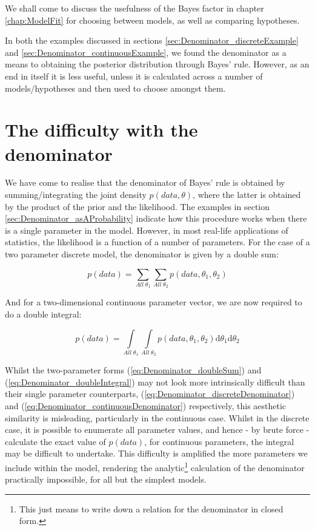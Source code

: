 \documentclass[11pt,fullpage]{book}
\begin{document}
We shall come to discuss the usefulness of the Bayes factor in chapter \ref{chap:ModelFit} for choosing between models, as well as comparing hypotheses.

In both the examples discussed in sections \ref{sec:Denominator_discreteExample} and \ref{sec:Denominator_continuousExample}, we found the denominator as a means to obtaining the posterior distribution through Bayes' rule. However, as an end in itself it is less useful, unless it is calculated across a number of models/hypotheses and then used to choose amongst them.

\section{The difficulty with the denominator}\label{sec:Denominator_difficulty}
We have come to realise that the denominator of Bayes' rule is obtained by summing/integrating the joint density $p(data,\theta)$, where the latter is obtained by the product of the prior and the likelihood. The examples in section \ref{sec:Denominator_asAProbability} indicate how this procedure works when there is a single parameter in the model. However, in most real-life applications of statistics, the likelihood is a function of a number of parameters. For the case of a two parameter discrete model, the denominator is given by a double sum:

\begin{equation}\label{eq:Denominator_doubleSum}
p(data) = \sum\limits_{All\;\theta_1}\sum\limits_{All\;\theta_2}p(data,\theta_1,\theta_2)
\end{equation}

And for a two-dimensional continuous parameter vector, we are now required to do a double integral:

\begin{equation}\label{eq:Denominator_doubleIntegral}
p(data) = \int\limits_{All\;\theta_1}\int\limits_{All\;\theta_2}p(data,\theta_1,\theta_2)\mathrm{d}\theta_1\mathrm{d}\theta_2
\end{equation}

Whilst the two-parameter forms (\ref{eq:Denominator_doubleSum}) and (\ref{eq:Denominator_doubleIntegral}) may not look more intrinsically difficult than their single parameter counterparts, (\ref{eq:Denominator_discreteDenominator}) and (\ref{eq:Denominator_continuousDenominator}) respectively, this aesthetic similarity is misleading, particularly in the continuous case. Whilst in the discrete case, it is possible to enumerate all parameter values, and hence - by brute force - calculate the exact value of $p(data)$, for continuous parameters, the integral may be difficult to undertake. This difficulty is amplified the more parameters we include within the model, rendering the analytic\footnote{This just means to write down a relation for the denominator in closed form.} calculation of the denominator practically impossible, for all but the simplest models.
\end{document}
